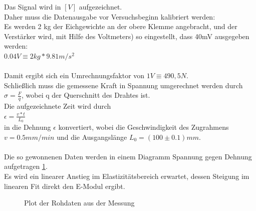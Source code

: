 \documentclass[12pt,a4paper]{article}
\begin{document}
\begin{multicols}{2}
Das Signal wird in $[V]$ aufgezeichnet.\\
Daher muss die Datenausgabe vor Versuchsbeginn kalibriert werden:\\
Es werden 2 kg der Eichgewichte an der obere Klemme angebracht, und der Verstärker wird, mit Hilfe des Voltmeters) so eingestellt, dass 40mV ausgegeben werden:\\
$0.04 V \equiv 2 kg * 9.81 m/s^2 $\\
\\
Damit ergibt sich ein Umrechnungsfaktor von $1V \equiv 490,5 N $.\\
Schließlich muss die gemessene Kraft in Spannung umgerechnet werden durch $\sigma = \frac{F}{q}$, wobei q der Querschnitt des Drahtes ist.\\
Die aufgezeichnete Zeit wird durch\\
$ \epsilon = \frac{v*t}{L_{0}} $\\
in die Dehnung $\epsilon$ konvertiert, wobei die Geschwindigkeit des Zugrahmens\\
 $v = 0.5 mm/min$ und die Ausgangslänge $ L_{0} = (100 \pm 0.1) mm $.\\
\\
Die so gewonnenen Daten werden in einem Diagramm Spannung gegen Dehnung aufgetragen \ref{fig:orig_Vs_plot}.\\
Es wird ein linearer Anstieg im Elastizitätsbereich erwartet, dessen Steigung im linearen Fit direkt den E-Modul ergibt.\\

\begin{figure}[H]
    	\caption{Plot der Rohdaten aus der Messung}
	\label{fig:orig_Vs_plot}
\end{figure}



\end{multicols}
\end{document}
